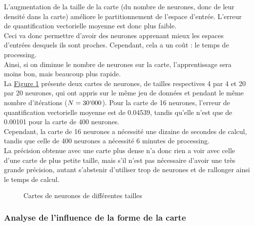 \documentclass{article}
\begin{document}
L'augmentation de la taille de la carte (du nombre de neurones, donc de leur densité dans la carte) améliore le partitionnement de l'espace d'entrée. L'erreur de quantification vectorielle moyenne est donc plus faible. \\
Ceci va donc permettre d'avoir des neurones apprenant mieux les espaces d'entrées desquels ils sont proches. Cependant, cela a un coût : le temps de processing.\\
Ainsi, si on diminue le nombre de neurones sur la carte, l'apprentissage sera moins bon, mais beaucoup plus rapide.\\
La \hyperlink{figure-taille-carte}{Figure \ref{figure-taille-carte}} présente deux cartes de neurones, de tailles respectives 4 par 4 et 20 par 20 neurones, qui ont appris sur le même jeu de données et pendant le même nombre d'itérations ($N = 30`000$). Pour la carte de 16 neurones, l'erreur de quantification vectorielle moyenne est de 0.04539, tandis qu'elle n'est que de 0.00101 pour la carte de 400 neurones.\\
Cependant, la carte de 16 neurones a nécessité une dizaine de secondes de calcul, tandis que celle de 400 neurones a nécessité 6 minutes de processing.\\
La précision obtenue avec une carte plus dense n'a donc rien a voir avec celle d'une carte de plus petite taille, mais s'il n'est pas nécessaire d'avoir une très grande précision, autant s'abstenir d'utiliser trop de neurones et de rallonger ainsi le temps de calcul.

\begin{figure}[H]
    \centering
    \hypertarget{figure-taille-carte}{}
    \caption{Cartes de neurones de différentes tailles}
    \label{figure-taille-carte}
\end{figure}

\subsubsection{Analyse de l'influence de la forme de la carte}
\end{document}
